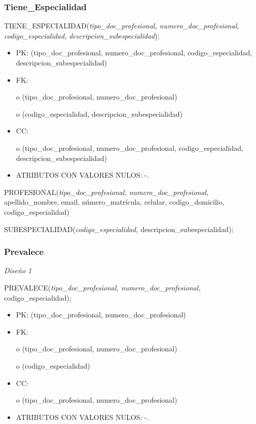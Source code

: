 \documentclass[a4paper,11pt]{article}
\begin{document}
\subsubsection{\textbf{Tiene\_Especialidad}}

TIENE\_ESPECIALIDAD(\emph{tipo\_doc\_profesional, numero\_doc\_profesional, codigo\_especialidad,} 
\emph{descripcion\_subespecialidad});

\begin{itemize}
\item PK: (tipo\_doc\_profesional, numero\_doc\_profesional, codigo\_especialidad, 
descripcion\_subespecialidad)

\item FK: 

o (tipo\_doc\_profesional, numero\_doc\_profesional)

o (codigo\_especialidad, descripcion\_subespecialidad)

\item CC:

o (tipo\_doc\_profesional, numero\_doc\_profesional, codigo\_especialidad, descripcion\_subespecialidad)

\item ATRIBUTOS CON VALORES NULOS:  -.
\end{itemize}

PROFESIONAL(\emph{tipo\_doc\_profesional, numero\_doc\_profesional}, apellido\_nombre, 
email, número\_matrícula, celular,\textit{\textbf{ }}codigo\_domicilio, codigo\_especialidad)

SUBESPECIALIDAD(\emph{codigo\_especialidad, }descripcion\_subespecialidad);\label{HToc293405845}

\subsubsection{\textbf{Prevalece}}

\textit{Diseño 1}

PREVALECE(\emph{tipo\_doc\_profesional, numero\_doc\_profesional}\textit{, }codigo\_especialidad);

\begin{itemize}
\item PK: (tipo\_doc\_profesional, numero\_doc\_profesional)

\item FK: 

o (tipo\_doc\_profesional, numero\_doc\_profesional)

o (codigo\_especialidad)

\item CC:

o (tipo\_doc\_profesional, numero\_doc\_profesional)

\item ATRIBUTOS CON VALORES NULOS:  -.
\end{itemize}
\end{document}
